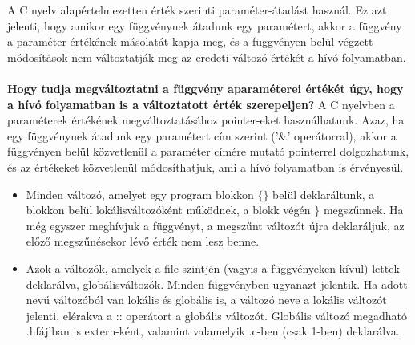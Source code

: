 \documentclass[11pt,a4paper]{article}
\begin{document}
            \begin{tcolorbox}[colback=blue!5!white,colframe=blue!50!black,title= 60. Milyen paraméter-átadást használ a C nyelv?]
                A C nyelv alapértelmezetten érték szerinti paraméter-átadást használ. Ez azt jelenti, hogy amikor egy függvénynek átadunk egy paramétert, akkor a függvény a paraméter értékének másolatát kapja meg, és a függvényen belül végzett módosítások nem változtatják meg az eredeti változó értékét a hívó folyamatban.\\ \\
                \textbf{Hogy tudja megváltoztatni a függvény aparaméterei értékét úgy, hogy a hívó folyamatban is a változtatott érték szerepeljen?}
                A C nyelvben a paraméterek értékének megváltoztatásához pointer-eket használhatunk. Azaz, ha egy függvénynek átadunk egy paramétert cím szerint ('\&' operátorral), akkor a függvényen belül közvetlenül a paraméter címére mutató pointerrel dolgozhatunk, és az értékeket közvetlenül módosíthatjuk, ami a hívó folyamatban is érvényesül.
            \end{tcolorbox}

            \begin{tcolorbox}[colback=blue!5!white,colframe=blue!50!black,title= 61. Ismertesse a lokális és globális változó fogalmakat!]
                \begin{itemize}
                    \item Minden változó, amelyet egy program blokkon \(\{\}\) belül deklaráltunk, a blokkon belül lokálisváltozóként működnek, a blokk végén \(\}\) megszűnnek. Ha még egyszer meghívjuk a függvényt, a megszűnt változót újra deklaráljuk, az előző megszűnésekor lévő érték nem lesz benne.
                    \item Azok a változók, amelyek a file szintjén (vagyis a függvényeken kívül) lettek deklarálva, globálisváltozók. Minden függvényben ugyanazt jelentik. Ha adott nevű változóból van lokális és globális is, a változó neve a lokális változót jelenti, elérakva a :: operátort a globális változót. Globális változó megadható .hfájlban is extern-ként, valamint valamelyik .c-ben (csak 1-ben) deklarálva.
                \end{itemize}
            \end{tcolorbox}
\end{document}

